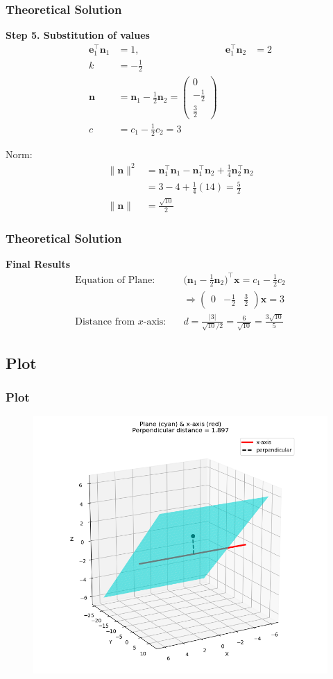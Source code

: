 \documentclass{beamer}
\theoremstyle{remark}
\newcommand{\myvec}[1]{\ensuremath{\begin{pmatrix}#1\end{pmatrix}}}
\let\vec\mathbf
\numberwithin{equation}{section}
\begin{document}
\begin{frame}
\frametitle{Theoretical Solution}
\textbf{Step 5. Substitution of values}
\begin{align}
\vec{e}_1^\top \vec{n}_1 &= 1, & \vec{e}_1^\top \vec{n}_2 &= 2 \\
k &= -\tfrac{1}{2} \\
\vec{n} &= \vec{n}_1 - \tfrac{1}{2}\vec{n}_2 = \myvec{0\\ -\tfrac12 \\ \tfrac32} \\
c &= c_1 - \tfrac{1}{2} c_2 = 3
\end{align}

Norm:
\begin{align}
\|\vec{n}\|^2 &= \vec{n}_1^\top \vec{n}_1 
- \vec{n}_1^\top \vec{n}_2 
+ \tfrac{1}{4}\vec{n}_2^\top \vec{n}_2 \\
&= 3 - 4 + \tfrac{1}{4}(14) = \tfrac{5}{2} \\
\|\vec{n}\| &= \tfrac{\sqrt{10}}{2}
\end{align}

\end{frame}

\begin{frame}
\frametitle{Theoretical Solution}
\textbf{Final Results}
\begin{align}
\text{Equation of Plane:} \quad 
&\big(\vec{n}_1 - \tfrac{1}{2}\vec{n}_2\big)^\top \vec{x} = c_1 - \tfrac{1}{2}c_2 \\
&\Longrightarrow \myvec{0 & -\tfrac12 & \tfrac32}\vec{x} = 3 \\[6pt]
\text{Distance from $x$-axis:} \quad 
&d = \frac{|3|}{\sqrt{10}/2} = \frac{6}{\sqrt{10}} = \frac{3\sqrt{10}}{5}
\end{align}

\end{frame}







\subsection{Plot}
\begin{frame}
    \frametitle{Plot}
\begin{figure}[H]
   \centering
   \includegraphics[width=0.7\columnwidth]{figs/plane.png}
   \caption{}
   \label{}
   \end{figure}
\end{frame}
\end{document}
